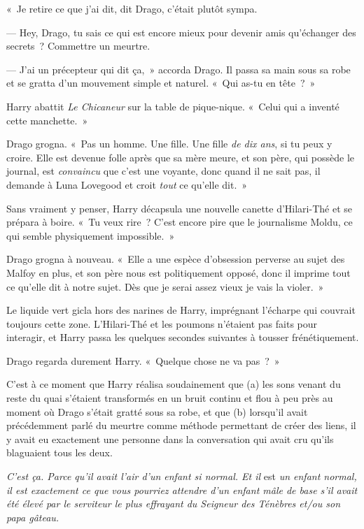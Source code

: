 «~Je retire ce que j'ai dit, dit Drago, c'était plutôt sympa.

--- Hey, Drago, tu sais ce qui est encore mieux pour devenir amis qu'échanger des secrets~? Commettre un meurtre.

--- J'ai un précepteur qui dit ça,~» accorda Drago. Il passa sa main sous sa robe et se gratta d'un mouvement simple et naturel. «~Qui as-tu en tête~?~»

Harry abattit \emph{Le Chicaneur} sur la table de pique-nique. «~Celui qui a inventé cette manchette.~»

Drago grogna. «~Pas un homme. Une fille. Une fille \emph{de dix ans}, si tu peux y croire. Elle est devenue folle après que sa mère meure, et son père, qui possède le journal, est \emph{convaincu} que c'est une voyante, donc quand il ne sait pas, il demande à Luna Lovegood et croit \emph{tout} ce qu'elle dit.~»

Sans vraiment y penser, Harry décapsula une nouvelle canette d'Hilari-Thé et se prépara à boire. «~Tu veux rire~? C'est encore pire que le journalisme Moldu, ce qui semble physiquement impossible.~»

Drago grogna à nouveau. «~Elle a une espèce d'obsession perverse au sujet des Malfoy en plus, et son père nous est politiquement opposé, donc il imprime tout ce qu'elle dit à notre sujet. Dès que je serai assez vieux je vais la violer.~»

Le liquide vert gicla hors des narines de Harry, imprégnant l'écharpe qui couvrait toujours cette zone. L'Hilari-Thé et les poumons n'étaient pas faits pour interagir, et Harry passa les quelques secondes suivantes à tousser frénétiquement.

Drago regarda durement Harry. «~Quelque chose ne va pas~?~»

C'est à ce moment que Harry réalisa soudainement que (a) les sons venant du reste du quai s'étaient transformés en un bruit continu et flou à peu près au moment où Drago s'était gratté sous sa robe, et que (b) lorsqu'il avait précédemment parlé du meurtre comme méthode permettant de créer des liens, il y avait eu exactement une personne dans la conversation qui avait cru qu'ils blaguaient tous les deux.

\emph{C'est ça. Parce qu'il avait l'air d'un enfant si normal. Et il} est \emph{un enfant normal, il est exactement ce que vous pourriez attendre d'un enfant mâle de base s'il avait été élevé par le serviteur le plus effrayant du Seigneur des Ténèbres et/ou son papa gâteau.}

